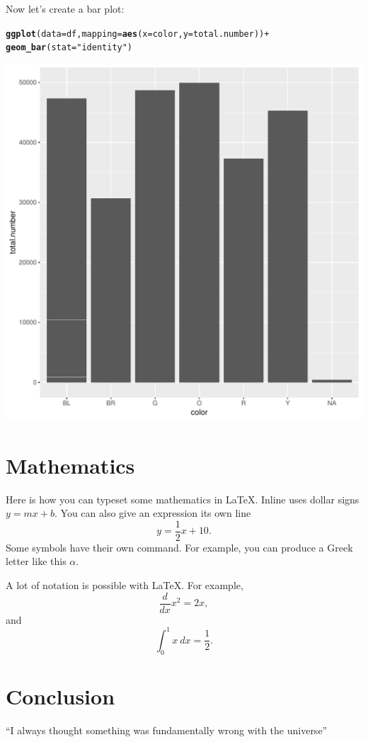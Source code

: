 \documentclass{article}\usepackage[]{graphicx}\usepackage[]{color}
\makeatletter
\def\maxwidth{ %
  \ifdim\Gin@nat@width>\linewidth
    \linewidth
  \else
    \Gin@nat@width
  \fi
}
\newcommand{\hlstr}[1]{\textcolor[rgb]{0.192,0.494,0.8}{#1}}%
\newcommand{\hlopt}[1]{\textcolor[rgb]{0,0,0}{#1}}%
\newcommand{\hlstd}[1]{\textcolor[rgb]{0.345,0.345,0.345}{#1}}%
\newcommand{\hlkwc}[1]{\textcolor[rgb]{0.333,0.667,0.333}{#1}}%
\newcommand{\hlkwd}[1]{\textcolor[rgb]{0.737,0.353,0.396}{\textbf{#1}}}%
\newenvironment{kframe}{%
 \def\at@end@of@kframe{}%
 \ifinner\ifhmode%
  \def\at@end@of@kframe{\end{minipage}}%
  \begin{minipage}{\columnwidth}%
 \fi\fi%
 \def\FrameCommand##1{\hskip\@totalleftmargin \hskip-\fboxsep
 \colorbox{shadecolor}{##1}\hskip-\fboxsep
     \hskip-\linewidth \hskip-\@totalleftmargin \hskip\columnwidth}%
 \MakeFramed {\advance\hsize-\width
   \@totalleftmargin\z@ \linewidth\hsize
   \@setminipage}}%
 {\par\unskip\endMakeFramed%
 \at@end@of@kframe}
\newenvironment{knitrout}{}{} %
\makeatother
\begin{document}
Now let's create a bar plot:
\begin{knitrout}
\color{fgcolor}\begin{kframe}
\begin{alltt}
\hlkwd{ggplot}\hlstd{(}\hlkwc{data}\hlstd{=df,}\hlkwc{mapping} \hlstd{=} \hlkwd{aes}\hlstd{(}\hlkwc{x}\hlstd{=color,}\hlkwc{y}\hlstd{=total.number))} \hlopt{+}
  \hlkwd{geom_bar}\hlstd{(}\hlkwc{stat}\hlstd{=}\hlstr{"identity"}\hlstd{)}
\end{alltt}
\end{kframe}
\includegraphics[width=\maxwidth]{figure/unnamed-chunk-5-1} 

\end{knitrout}

\section{Mathematics}

Here is how you can typeset some mathematics in \LaTeX. Inline uses dollar signs $y = mx + b$. You can also give an expression its own line
\[ y = \frac{1}{2}x + 10. \]
Some symbols have their own command. For example, you can produce a Greek letter like this $\alpha$. 

A lot of notation is possible with \LaTeX. For example, 
\[ \frac{d}{dx}x^2 = 2x,  \]
and
\[ \int_{0}^{1}x\ dx = \frac{1}{2}. \]

\section{Conclusion}
``I always thought something was fundamentally wrong with the universe'' \citep{adams1995hitchhiker}



\end{document}

